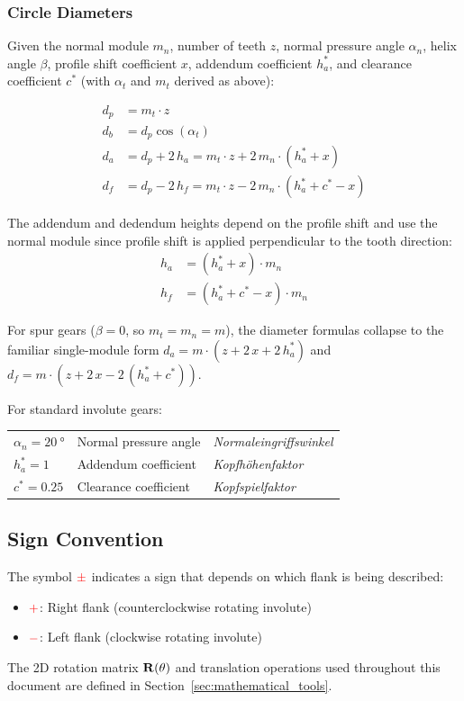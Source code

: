 \subsubsection*{Circle Diameters}
Given the normal module $m_n$, number of teeth $z$, normal pressure angle $\alpha_n$, helix angle $\beta$, profile shift coefficient $x$, addendum coefficient $h_a^*$, and clearance coefficient $c^*$ (with $\alpha_t$ and $m_t$ derived as above):

\begin{align}
    d_p &= m_t \cdot z \\
    d_b &= d_p \cos(\alpha_t) \\
    d_a &= d_p + 2\,h_a = m_t \cdot z + 2\,m_n\cdot(h_a^* + x) \\
    d_f &= d_p - 2\,h_f = m_t \cdot z - 2\,m_n\cdot(h_a^* + c^* - x)
\end{align}

The addendum and dedendum heights depend on the profile shift and use the normal module since profile shift is applied perpendicular to the tooth direction:
\begin{align}
    h_a &= (h_a^* + x) \cdot m_n \\
    h_f &= (h_a^* + c^* - x) \cdot m_n
\end{align}

For spur gears ($\beta = 0$, so $m_t = m_n = m$), the diameter formulas collapse to the familiar single-module form $d_a = m\cdot(z + 2\,x + 2\,h_a^*)$ and $d_f = m\cdot(z + 2\,x - 2\,(h_a^*+c^*))$.

For standard involute gears:
\begin{center}
\begin{tabular}{@{}lll@{}}
    $\alpha_n = \SI{20}{\degree}$ & Normal pressure angle & \textit{Normaleingriffswinkel} \\
    $h_a^* = 1$ & Addendum coefficient & \textit{Kopfhöhenfaktor} \\
    $c^* = 0.25$ & Clearance coefficient & \textit{Kopfspielfaktor} \\
\end{tabular}
\end{center}

\subsection{Sign Convention}
The symbol $\textcolor{red}{\pm}$ indicates a sign that depends on which flank is being described:
\begin{itemize}
    \item $\textcolor{red}{+}$: Right flank (counterclockwise rotating involute)
    \item $\textcolor{red}{-}$: Left flank (clockwise rotating involute)
\end{itemize}

The 2D rotation matrix $\vb{R}(\theta)$ and translation operations used throughout this document are defined in Section~\ref{sec:mathematical_tools}.

